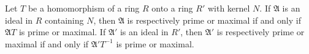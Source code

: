 Let $T$ be a homomorphism of a ring $R$ onto a ring $R'$ with kernel $N$. If $\mathfrak{A}$ is an ideal in $R$ containing $N$, then $\mathfrak{A}$ is respectively prime or maximal if and only if $\mathfrak{A}T$ is prime or maximal. If $\mathfrak{A}'$ is an ideal in $R'$, then $\mathfrak{A}'$ is respectively prime or maximal if and only if $\mathfrak{A}'T^{-1}$ is prime or maximal.
